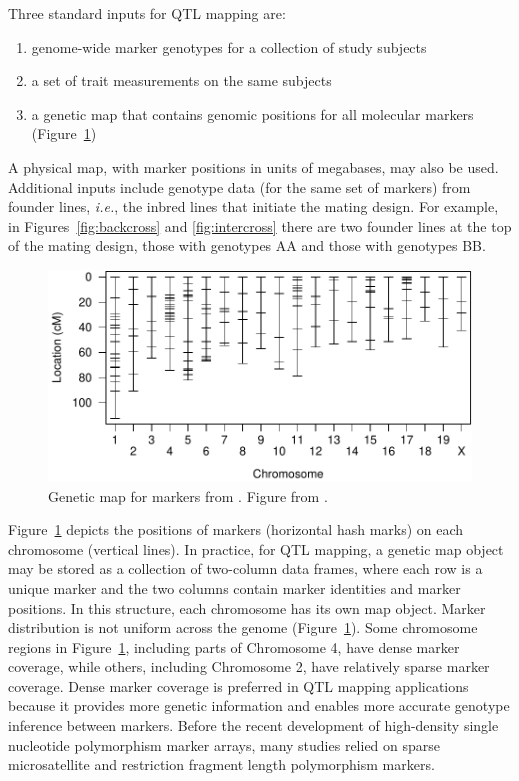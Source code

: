 \documentclass[oneside]{book}\usepackage[]{graphicx}\usepackage[]{color}
\newenvironment{knitrout}{}{} %
\begin{document}
Three standard inputs for QTL mapping are:
\begin{enumerate}
\item genome-wide marker genotypes for a collection of study subjects
\item a set of trait measurements on the same subjects
\item a genetic map that contains genomic positions for all molecular markers (Figure~\ref{fig:map}) \citep{sturtevant1913linear}
\end{enumerate}

A physical map, with marker positions in 
units of megabases, may also be used. 
Additional inputs include genotype data (for the same
set of markers) from founder lines, \emph{i.e.}, the inbred lines that initiate
the mating design. For example, in Figures~\ref{fig:backcross} and \ref{fig:intercross}
there are two founder lines at the top of the mating design, those with genotypes AA and those with genotypes BB. 

\begin{knitrout}
\color{fgcolor}\begin{figure}
\includegraphics[width=6in]{figure/map-1} \caption{Genetic map for markers from \citet{sugiyama2001concordance}. Figure from \citet{broman2009guide}.}\label{fig:map}
\end{figure}


\end{knitrout}

Figure~\ref{fig:map} depicts the positions of markers (horizontal hash marks) on 
each chromosome (vertical lines). In practice, for QTL mapping, a genetic map 
object may be stored as a collection of two-column data frames, where each row is a 
unique marker and the two columns contain marker identities and marker positions. 
In this structure, each chromosome has its own map object. Marker distribution is 
not uniform across the 
genome (Figure~\ref{fig:map}). Some chromosome regions in Figure~\ref{fig:map}, including parts of 
Chromosome 4, have dense marker 
coverage, while others, including Chromosome 2, have relatively sparse marker 
coverage. Dense marker coverage is preferred in QTL mapping applications because it 
provides more genetic information and enables more accurate genotype inference between markers. Before the recent development of high-density 
single nucleotide polymorphism marker arrays, many studies relied on sparse 
microsatellite and restriction fragment length polymorphism markers. 
\end{document}

